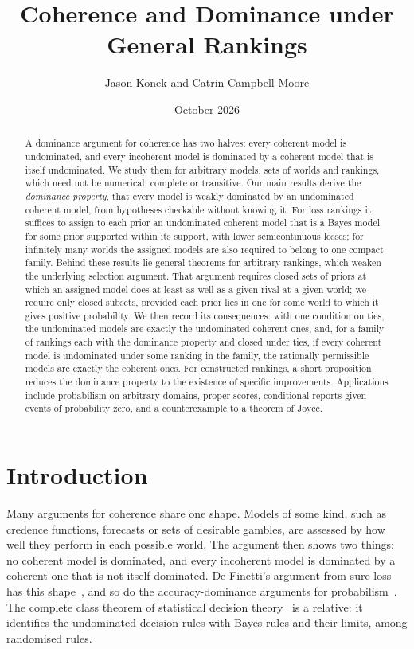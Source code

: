 \documentclass[11pt]{article}
\title{Coherence and Dominance under General Rankings}
\author{Jason Konek and Catrin Campbell-Moore}
\date{October 2026}
\theoremstyle{definition}
\theoremstyle{remark}
\begin{document}
\maketitle

\begin{abstract}
A dominance argument for coherence has two halves: every coherent model is undominated, and every incoherent model is dominated by a coherent model that is itself undominated. We study them for arbitrary models, sets of worlds and rankings, which need not be numerical, complete or transitive. Our main results derive the \emph{dominance property}, that every model is weakly dominated by an undominated coherent model, from hypotheses checkable without knowing it. For loss rankings it suffices to assign to each prior an undominated coherent model that is a Bayes model for some prior supported within its support, with lower semicontinuous losses; for infinitely many worlds the assigned models are also required to belong to one compact family. Behind these results lie general theorems for arbitrary rankings, which weaken the underlying selection argument. That argument requires closed sets of priors at which an assigned model does at least as well as a given rival at a given world; we require only closed subsets, provided each prior lies in one for some world to which it gives positive probability. We then record its consequences: with one condition on ties, the undominated models are exactly the undominated coherent ones, and, for a family of rankings each with the dominance property and closed under ties, if every coherent model is undominated under some ranking in the family, the rationally permissible models are exactly the coherent ones. For constructed rankings, a short proposition reduces the dominance property to the existence of specific improvements. Applications include probabilism on arbitrary domains, proper scores, conditional reports given events of probability zero, and a counterexample to a theorem of Joyce.
\end{abstract}

\section{Introduction}\label{sec:intro}

Many arguments for coherence share one shape. Models of some kind, such as credence functions, forecasts or sets of desirable gambles, are assessed by how well they perform in each possible world. The argument then shows two things: no coherent model is dominated, and every incoherent model is dominated by a coherent one that is not itself dominated. De Finetti's argument from sure loss has this shape~\cite{deFinetti}, and so do the accuracy-dominance arguments for probabilism~\cite{Joyce,Predd,SSK09,Pettigrew,Nielsen}. The complete class theorem of statistical decision theory~\cite{Wald} is a relative: it identifies the undominated decision rules with Bayes rules and their limits, among randomised rules.
\end{document}
